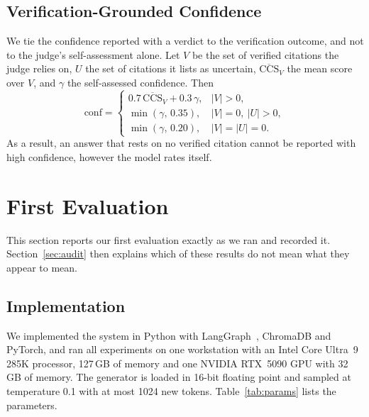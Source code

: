 \documentclass[conference]{IEEEtran}
\begin{document}
\subsection{Verification-Grounded Confidence}
We tie the confidence reported with a verdict to the verification outcome, and not to the judge's self-assessment alone. Let $V$ be the set of verified citations the judge relies on, $U$ the set of citations it lists as uncertain, $\overline{\mathrm{CCS}}_V$ the mean score over $V$, and $\gamma$ the self-assessed confidence. Then
\begin{equation}
\mathrm{conf} =
\begin{cases}
0.7\,\overline{\mathrm{CCS}}_V + 0.3\,\gamma, & |V| > 0,\\
\min(\gamma,\, 0.35), & |V| = 0,\ |U| > 0,\\
\min(\gamma,\, 0.20), & |V| = |U| = 0.
\end{cases}
\end{equation}
As a result, an answer that rests on no verified citation cannot be reported with high confidence, however the model rates itself.

\section{First Evaluation}\label{sec:first}
This section reports our first evaluation exactly as we ran and recorded it. Section~\ref{sec:audit} then explains which of these results do not mean what they appear to mean.

\subsection{Implementation}
We implemented the system in Python with LangGraph~\cite{langgraph}, ChromaDB and PyTorch, and ran all experiments on one workstation with an Intel Core Ultra~9 285K processor, 127\,GB of memory and one NVIDIA RTX~5090 GPU with 32\,GB of memory. The generator is loaded in 16-bit floating point and sampled at temperature 0.1 with at most 1024 new tokens. Table~\ref{tab:params} lists the parameters.
\end{document}
